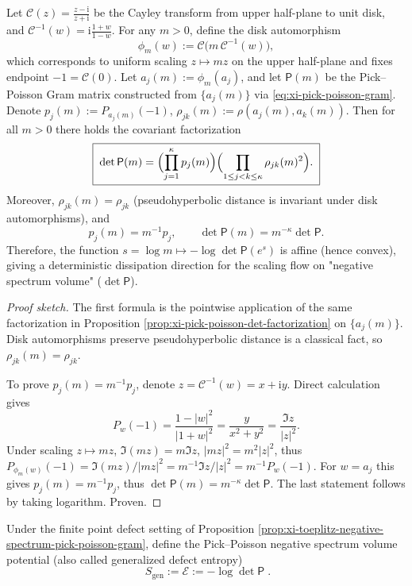 \begin{proposition}\label{prop:xi-pick-poisson-det-scaling-law}
Let \(\mathcal{C}(z)=\frac{z-\mathrm{i}}{z+\mathrm{i}}\) be the Cayley transform from upper half-plane to unit disk, and \(\mathcal{C}^{-1}(w)=\mathrm{i}\frac{1+w}{1-w}\).
For any \(m>0\), define the disk automorphism
\[
\phi_m(w):=\mathcal{C}\!\bigl(m\,\mathcal{C}^{-1}(w)\bigr),
\]
which corresponds to uniform scaling \(z\mapsto mz\) on the upper half-plane and fixes endpoint \(-1=\mathcal{C}(0)\).
Let \(a_j(m):=\phi_m(a_j)\), and let \(\mathsf P(m)\) be the Pick--Poisson Gram matrix constructed from \(\{a_j(m)\}\) via \eqref{eq:xi-pick-poisson-gram}.
Denote \(p_j(m):=P_{a_j(m)}(-1)\), \(\rho_{jk}(m):=\rho(a_j(m),a_k(m))\).
Then for all \(m>0\) there holds the covariant factorization
\[
\boxed{\;
\det\mathsf P(m)
=\Bigl(\prod_{j=1}^{\kappa}p_j(m)\Bigr)\Bigl(\prod_{1\le j<k\le\kappa}\rho_{jk}(m)^2\Bigr).\;}
\]
Moreover, \(\rho_{jk}(m)=\rho_{jk}\) (pseudohyperbolic distance is invariant under disk automorphisms), and
\[
\boxed{\;p_j(m)=m^{-1}p_j,\qquad \det\mathsf P(m)=m^{-\kappa}\det\mathsf P.\;}
\]
Therefore, the function \(s=\log m\mapsto -\log\det\mathsf P(e^s)\) is affine (hence convex), giving a deterministic dissipation direction for the scaling flow on "negative spectrum volume" (\(\det\mathsf P\)).
\end{proposition}
\begin{proof}[Proof sketch]
The first formula is the pointwise application of the same factorization in Proposition \ref{prop:xi-pick-poisson-det-factorization} on \(\{a_j(m)\}\).
Disk automorphisms preserve pseudohyperbolic distance is a classical fact, so \(\rho_{jk}(m)=\rho_{jk}\).
\par
To prove \(p_j(m)=m^{-1}p_j\), denote \(z=\mathcal{C}^{-1}(w)=x+\mathrm{i}y\).
Direct calculation gives
\[
P_{w}(-1)=\frac{1-|w|^2}{|1+w|^2}
=\frac{y}{x^2+y^2}
=\frac{\Im z}{|z|^2}.
\]
Under scaling \(z\mapsto mz\), \(\Im(mz)=m\Im z\), \(|mz|^2=m^2|z|^2\), thus
\(
P_{\phi_m(w)}(-1)=\Im(mz)/|mz|^2=m^{-1}\Im z/|z|^2
=m^{-1}P_w(-1)
\).
For \(w=a_j\) this gives \(p_j(m)=m^{-1}p_j\), thus \(\det\mathsf P(m)=m^{-\kappa}\det\mathsf P\).
The last statement follows by taking logarithm. Proven.
\end{proof}

\begin{definition}\label{def:xi-generalized-defect-entropy-logdet}
Under the finite point defect setting of Proposition \ref{prop:xi-toeplitz-negative-spectrum-pick-poisson-gram}, define the Pick--Poisson negative spectrum volume potential (also called generalized defect entropy)
\[
\boxed{\;
S_{\mathrm{gen}}
:=\mathcal{E}
:=-\log\det\mathsf P\; }.
\]
\end{definition}

